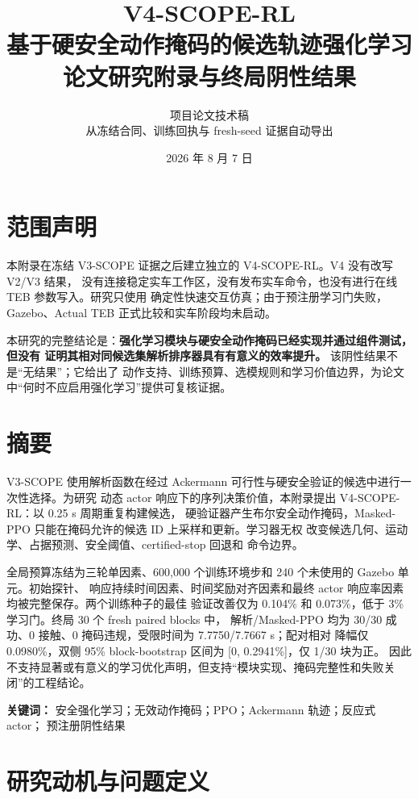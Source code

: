 \documentclass[12pt,a4paper,oneside]{report}
\title{\Huge V4-SCOPE-RL\\[0.4em]
\Large 基于硬安全动作掩码的候选轨迹强化学习\\[0.8em]
\large 论文研究附录与终局阴性结果}
\author{项目论文技术稿\\\small 从冻结合同、训练回执与 fresh-seed 证据自动导出}
\date{2026 年 8 月 7 日}
\begin{document}
\maketitle

\chapter*{范围声明}
本附录在冻结 V3-SCOPE 证据之后建立独立的 V4-SCOPE-RL。V4 没有改写 V2/V3 结果，
没有连接稳定实车工作区，没有发布实车命令，也没有进行在线 TEB 参数写入。研究只使用
确定性快速交互仿真；由于预注册学习门失败，Gazebo、Actual TEB 正式比较和实车阶段均未启动。

本研究的完整结论是：\textbf{强化学习模块与硬安全动作掩码已经实现并通过组件测试，但没有
证明其相对同候选集解析排序器具有有意义的效率提升。} 该阴性结果不是“无结果”；它给出了
动作支持、训练预算、选模规则和学习价值边界，为论文中“何时不应启用强化学习”提供可复核证据。

\chapter*{摘要}
V3-SCOPE 使用解析函数在经过 Ackermann 可行性与硬安全验证的候选中进行一次性选择。为研究
动态 actor 响应下的序列决策价值，本附录提出 V4-SCOPE-RL：以 0.25 s 周期重复构建候选，
硬验证器产生布尔安全动作掩码，Masked-PPO 只能在掩码允许的候选 ID 上采样和更新。学习器无权
改变候选几何、运动学、占据预测、安全阈值、certified-stop 回退和
 命令边界。

全局预算冻结为三轮单因素、600,000 个训练环境步和 240 个未使用的 Gazebo 单元。初始探针、
响应持续时间因素、时间奖励对齐因素和最终 actor 响应率因素均被完整保存。两个训练种子的最佳
验证改善仅为 0.104\% 和 0.073\%，低于 3\% 学习门。终局 30 个 fresh paired blocks 中，
解析/Masked-PPO 均为 30/30 成功、0 接触、0 掩码违规，受限时间为 7.7750/7.7667 s；配对相对
降幅仅 0.0980\%，双侧 95\% block-bootstrap 区间为 [0, 0.2941\%]，仅 1/30 块为正。
因此不支持显著或有意义的学习优化声明，但支持“模块实现、掩码完整性和失败关闭”的工程结论。

\noindent\textbf{关键词：} 安全强化学习；无效动作掩码；PPO；Ackermann 轨迹；反应式 actor；
预注册阴性结果

\tableofcontents
\listoftables
\listoffigures
\clearpage
{}

\chapter{研究动机与问题定义}
\end{document}

